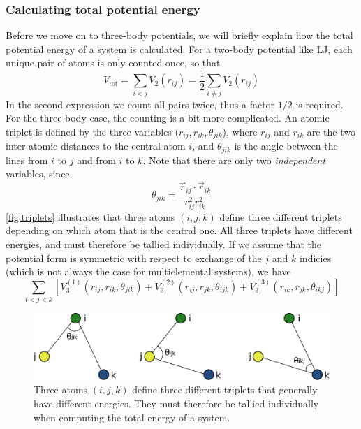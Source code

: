 \documentclass[twoside,english]{uiofysmaster}
\begin{document}
\subsubsection{Calculating total potential energy}
Before we move on to three-body potentials, we will briefly explain how the total potential energy of a system is calculated. 
For a two-body potential like LJ, each unique pair of atoms is only counted once, so that
\begin{equation}
 V_{\mathrm{tot}} = \sum_{i<j} V_2(r_{ij}) = \frac{1}{2}\sum_{i\neq j} V_2(r_{ij})
 \label{twoBodyPotentialEnergy}
\end{equation}
In the second expression we count all pairs twice, thus a factor $1/2$ is required. 
For the three-body case, the counting is a bit more complicated. An atomic triplet is defined by the three
variables $(r_{ij}, r_{ik}, \theta_{jik}$), where $r_{ij}$ and $r_{ik}$ are the 
two inter-atomic distances to the central atom $i$, and $\theta_{jik}$ is the angle between the lines from $i$ to $j$ and 
from $i$ to $k$. Note that there are only two \textit{independent} variables, since
\begin{equation}
 \theta_{jik} = \frac{\vec{r}_{ij} \cdot \vec{r}_{ik}}{r_{ij}^2r_{ik}^2}
\end{equation}
\autoref{fig:triplets} illustrates that three atoms $(i, j, k)$ define three different triplets depending
on which atom that is the central one. All three triplets have different energies, and must therefore be tallied individually.
If we assume that the potential form is symmetric with respect to exchange of the $j$ and $k$
indicies (which is not always the case for multielemental systems), we have
\begin{equation}
 \sum_{i<j<k}\left[V_3^{(1)}(r_{ij}, r_{ik}, \theta_{jik}) + V_3^{(2)}(r_{ij}, r_{jk}, \theta_{ijk}) + 
 V_3^{(3)}(r_{ik}, r_{jk}, \theta_{ikj})\right]
 \label{threeBodyPotentialEnergy1}
\end{equation}
\begin{figure}
 \centering
 \includegraphics[width = 0.8\linewidth]{Figures/Theory/triplets.pdf}
 \caption{Three atoms $(i,j,k)$ define three different triplets that generally have different energies. They must therefore 
          be tallied individually when computing the total energy of a system.}
 \label{fig:triplets}
\end{figure}
\end{document}
